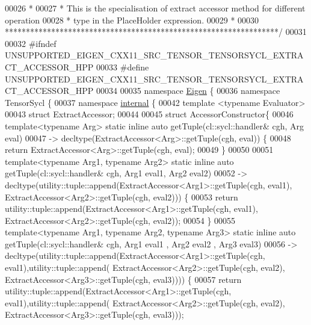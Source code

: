 \begin{DoxyCode}
00026 \textcolor{comment}{ *}
00027 \textcolor{comment}{ * This is the specialisation of extract accessor method for different operation}
00028 \textcolor{comment}{ * type in the PlaceHolder expression.}
00029 \textcolor{comment}{ *}
00030 \textcolor{comment}{*****************************************************************/}
00031 
00032 \textcolor{preprocessor}{#ifndef UNSUPPORTED\_EIGEN\_CXX11\_SRC\_TENSOR\_TENSORSYCL\_EXTRACT\_ACCESSOR\_HPP}
00033 \textcolor{preprocessor}{#define UNSUPPORTED\_EIGEN\_CXX11\_SRC\_TENSOR\_TENSORSYCL\_EXTRACT\_ACCESSOR\_HPP}
00034 
00035 \textcolor{keyword}{namespace }\hyperlink{namespace_eigen}{Eigen} \{
00036 \textcolor{keyword}{namespace }TensorSycl \{
00037 \textcolor{keyword}{namespace }\hyperlink{namespaceinternal}{internal} \{
00042 \textcolor{keyword}{template} <\textcolor{keyword}{typename} Evaluator>
00043 \textcolor{keyword}{struct }ExtractAccessor;
00044 
00045 \textcolor{keyword}{struct }AccessorConstructor\{
00046   \textcolor{keyword}{template}<\textcolor{keyword}{typename} Arg> \textcolor{keyword}{static} \textcolor{keyword}{inline} \textcolor{keyword}{auto} getTuple(cl::sycl::handler& cgh, Arg eval)
00047   -> decltype(ExtractAccessor<Arg>::getTuple(cgh, eval)) \{
00048   \textcolor{keywordflow}{return} ExtractAccessor<Arg>::getTuple(cgh, eval);
00049   \}
00050 
00051   \textcolor{keyword}{template}<\textcolor{keyword}{typename} Arg1, \textcolor{keyword}{typename} Arg2> \textcolor{keyword}{static} \textcolor{keyword}{inline} \textcolor{keyword}{auto} getTuple(cl::sycl::handler& cgh, Arg1 eval1, 
      Arg2 eval2)
00052   -> decltype(utility::tuple::append(ExtractAccessor<Arg1>::getTuple(cgh, eval1), 
      ExtractAccessor<Arg2>::getTuple(cgh, eval2))) \{
00053     \textcolor{keywordflow}{return} utility::tuple::append(ExtractAccessor<Arg1>::getTuple(cgh, eval1), 
      ExtractAccessor<Arg2>::getTuple(cgh, eval2));
00054   \}
00055   \textcolor{keyword}{template}<\textcolor{keyword}{typename} Arg1, \textcolor{keyword}{typename} Arg2, \textcolor{keyword}{typename} Arg3> \textcolor{keyword}{static} \textcolor{keyword}{inline} \textcolor{keyword}{auto} getTuple(cl::sycl::handler& cgh,
       Arg1 eval1 , Arg2 eval2 , Arg3 eval3)
00056   -> decltype(utility::tuple::append(ExtractAccessor<Arg1>::getTuple(cgh, eval1),utility::tuple::append(
      ExtractAccessor<Arg2>::getTuple(cgh, eval2), ExtractAccessor<Arg3>::getTuple(cgh, eval3)))) \{
00057     \textcolor{keywordflow}{return} utility::tuple::append(ExtractAccessor<Arg1>::getTuple(cgh, eval1),utility::tuple::append(
      ExtractAccessor<Arg2>::getTuple(cgh, eval2), ExtractAccessor<Arg3>::getTuple(cgh, eval3)));

\end{DoxyCode}
